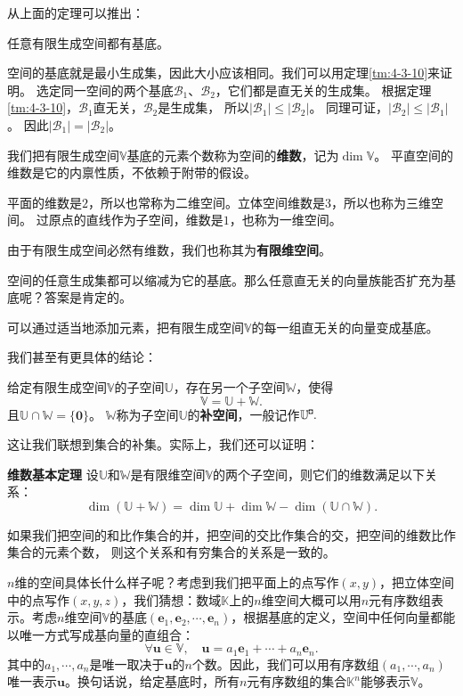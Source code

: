 \documentclass[12pt,UTF8,fontset=none]{ctexbook}
\begin{document}
从上面的定理可以推出：
\begin{tm}\label{tm:4-3-50}
    任意有限生成空间都有基底。
\end{tm}

空间的基底就是最小生成集，因此大小应该相同。我们可以用定理\ref{tm:4-3-10}来证明。
选定同一空间的两个基底$\mathcal{B}_1$、$\mathcal{B}_2$，它们都是直无关的生成集。
根据定理\ref{tm:4-3-10}，$\mathcal{B}_1$直无关，$\mathcal{B}_2$是生成集，
所以$|\mathcal{B}_1| \leqslant |\mathcal{B}_2|$。
同理可证，$|\mathcal{B}_2| \leqslant |\mathcal{B}_1|$。
因此$|\mathcal{B}_1| = |\mathcal{B}_2|$。

我们把有限生成空间$\mathbb{V}$基底的元素个数称为空间的\textbf{维数}，记为$\dim \mathbb{V}$。
平直空间的维数是它的内禀性质，不依赖于附带的假设。

平面的维数是$2$，所以也常称为二维空间。立体空间维数是$3$，所以也称为三维空间。
过原点的直线作为子空间，维数是$1$，也称为一维空间。

由于有限生成空间必然有维数，我们也称其为\textbf{有限维空间}。

空间的任意生成集都可以缩减为它的基底。那么任意直无关的向量族能否扩充为基底呢？答案是肯定的。
\begin{tm}\label{tm:4-3-60}
    可以通过适当地添加元素，把有限生成空间$\mathbb{V}$的每一组直无关的向量变成基底。
\end{tm}

我们甚至有更具体的结论：
\begin{tm}\label{tm:4-3-70}
    给定有限生成空间$\mathbb{V}$的子空间$\mathbb{U}$，存在另一个子空间$\mathbb{W}$，使得
    $$ \mathbb{V} = \mathbb{U} + \mathbb{W}.$$
    且$\mathbb{U} \cap \mathbb{W} = \{\mathbf{0}\}$。
    $\mathbb{W}$称为子空间$\mathbb{U}$的\textbf{补空间}，一般记作$\mathbb{U}^{\bu}.$
\end{tm}

这让我们联想到集合的补集。实际上，我们还可以证明：

\begin{tm}{\textbf{维数基本定理}}\label{tm:4-3-80}
    设$\mathbb{U}$和$\mathbb{W}$是有限维空间$\mathbb{V}$的两个子空间，则它们的维数满足以下关系：
    $$ \dim (\mathbb{U} + \mathbb{W}) = \dim \mathbb{U} + \dim \mathbb{W} - \dim (\mathbb{U} \cap \mathbb{W}).$$
\end{tm}
如果我们把空间的和比作集合的并，把空间的交比作集合的交，把空间的维数比作集合的元素个数，
则这个关系和有穷集合的关系是一致的。

$n$维的空间具体长什么样子呢？考虑到我们把平面上的点写作$(x, y)$，把立体空间中的点写作$(x, y, z)$，我们猜想：数域$\mathbb{K}$上的$n$维空间大概可以用$n$元有序数组表示。考虑$n$维空间$\mathbb{V}$的基底$(\mathbf{e}_1, \mathbf{e}_2, \cdots, \mathbf{e}_n)$，根据基底的定义，空间中任何向量都能以唯一方式写成基向量的直组合：
$$ \forall \mathbf{u} \in \mathbb{V}, \quad \mathbf{u} = a_1\mathbf{e}_1 + \cdots + a_n \mathbf{e}_n. $$
其中的$a_1, \cdots , a_n$是唯一取决于$\mathbf{u}$的$n$个数。因此，我们可以用有序数组$(a_1, \cdots , a_n)$唯一表示$\mathbf{u}$。换句话说，给定基底时，所有$n$元有序数组的集合$\mathbb{K}^n$能够表示$\mathbb{V}$。
\end{document}
